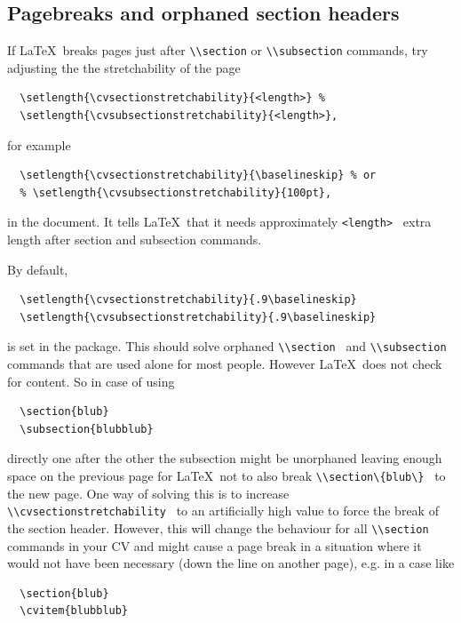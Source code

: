 \documentclass[a4paper,11pt]{article}
\newcommand{\code}[1]{\lstinline!#1!}
\newcommand{\Code}[1]{\lstinline!#1!~} %
\newcommand{\latex}{\LaTeX}
\begin{document}
\subsection{Pagebreaks and orphaned section headers}
If \latex\ breaks pages just after \code{\\section} or \code{\\subsection} commands, try adjusting
the the stretchability of the page
\begin{lstlisting}
  \setlength{\cvsectionstretchability}{<length>} %
  \setlength{\cvsubsectionstretchability}{<length>},
\end{lstlisting}
for example
\begin{lstlisting}
  \setlength{\cvsectionstretchability}{\baselineskip} % or
  % \setlength{\cvsubsectionstretchability}{100pt},
\end{lstlisting}
in the document. It tells \latex\ that it needs approximately \Code{<length>} extra length after
section and subsection commands.

By default,
\begin{lstlisting}
  \setlength{\cvsectionstretchability}{.9\baselineskip}
  \setlength{\cvsubsectionstretchability}{.9\baselineskip}
\end{lstlisting}

is set in the package.
This should solve orphaned \Code{\\section} and \Code{\\subsection} commands that are used alone for most people.
However \latex\ does not check for content. So in case of using
\begin{lstlisting}
  \section{blub}
  \subsection{blubblub}
\end{lstlisting}
directly one after the other the subsection might be unorphaned leaving enough space on the previous page for \latex\ not to also break \Code{\\section\{blub\}} to the new page.
One way of solving this is to increase \Code{\\cvsectionstretchability} to an artificially high value to force the break of the section header.
However, this will change the behaviour for all \Code{\\section} commands in your CV and might cause a page break in a situation where it would not have been necessary (down the line on another page), e.g. in a case like
\begin{lstlisting}
  \section{blub}
  \cvitem{blubblub}
\end{lstlisting}
\end{document}
